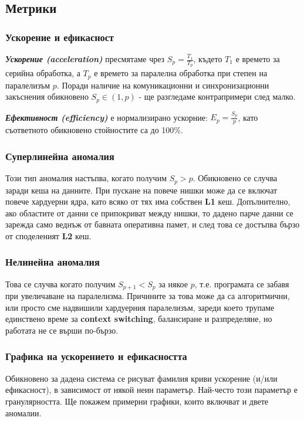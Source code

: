 \documentclass[fleqn,12pt]{article}
\begin{document}
\subsection{Метрики}
\subsubsection{Ускорение и ефикасност}
\textbf{\textit{Ускорение (acceleration)}} пресмятаме чрез $S_p = \frac{T_1}{T_p}$, където $T_1$ е времето за серийна обработка, а $T_p$ е времето за паралелна обработка при степен на паралелизъм $p$.
Поради наличие на комуникационни и синхронизационни закъснения обикновено $S_p \in (1, p)$ - ще разгледаме контрапримери след малко.

\textbf{\textit{Ефективност (efficiency)}} е нормализирано ускорние: $E_p = \frac{S_p}{p}$, като съответното обикновено стойностите са до 100\%.

\subsubsection{Суперлинейна аномалия}
Този тип аномалия настъпва, когато получим $S_p > p$. Обикновено се случва заради кеша на данните.
При пускане на повече нишки може да се включат повече хардуерни ядра, като всяко от тях има собствен \textbf{L1} кеш.
Допълнително, ако областите от данни се припокриват между нишки, то дадено парче данни се зарежда само веднъж от 
бавната оперативна памет, и след това се достъпва бързо от споделеният \textbf{L2} кеш.

\subsubsection{Нелинейна аномалия}
Това се случва когато получим $S_{p+1} < S_p$ за някое $p$, т.е. програмата се забавя при увеличаване на паралелизма.
Причините за това може да са алгоритмични, или просто сме надвишили хардуерния паралелизъм, зареди което трупаме единствено
време за \textbf{context switching}, балансиране и разпределяне, но работата не се върши по-бързо.

\subsubsection{Графика на ускорението и ефикасността}
Обикновено за дадена система се рисуват фамилия криви ускорение (и/или ефикасност), в зависимост от някой неин параметър.
Най-често този параметър е гранулярността. Ще покажем примерни графики, които включват и двете аномалии.
\end{document}
